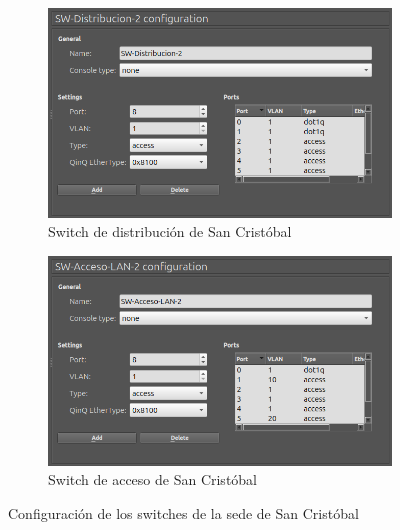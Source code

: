 \begin{figure}[H]
	\centering
	\begin{subfigure}[b]{0.49\textwidth}
		\centering
		\includegraphics[width=\textwidth]{images/SanCristobal_SW-Distribucion_configuration.png}
		\caption{Switch de distribución de San Cristóbal}
		\label{subfig:switches_san_cristobal_1}
	\end{subfigure}
	\hfill
	\begin{subfigure}[b]{0.49\textwidth}
		\centering
		\includegraphics[width=\textwidth]{images/SanCristobal_SW-Acceso_configuration.png}
		\caption{Switch de acceso de San Cristóbal}
		\label{subfig:switches_san_cristobal_2}
	\end{subfigure}
	\caption{Configuración de los switches de la sede de San Cristóbal}
	\label{fig:switches_san_cristobal}
\end{figure}

